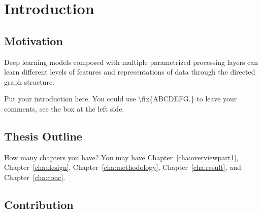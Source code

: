 \chapter{Introduction}
\label{cha:intro}


\section{Motivation}
\label{sec.motivation}
Deep learning models composed with multiple parametrized processing layers can learn different levels of features and representations of data through the directed graph structure.  


Put your introduction here. You could use \textbackslash fix\{ABCDEFG.\} to
leave your comments, see the box at the left side.  



\section{Thesis Outline}
\label{sec:outline}
How many chapters you have? You may have Chapter~\ref{cha:overviewpart1},
Chapter~\ref{cha:design}, Chapter~\ref{cha:methodology},
Chapter~\ref{cha:result}, and Chapter~\ref{cha:conc}.


\section{Contribution}
\label{sec.contribution}